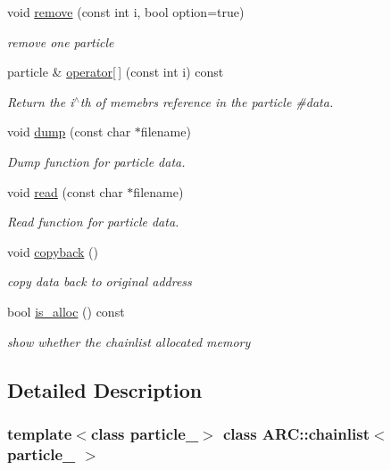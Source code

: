 \begin{DoxyCompactItemize}
void \hyperlink{classARC_1_1chainlist_ac11bd643c5ae8e8ec42623041a1ef34c}{remove} (const int i, bool option=true)
\begin{DoxyCompactList}\small\item\em remove one particle \end{DoxyCompactList}\item 
particle \& \hyperlink{classARC_1_1chainlist_aec9297c53f0f392257aed1c76c537884}{operator\mbox{[}$\,$\mbox{]}} (const int i) const
\begin{DoxyCompactList}\small\item\em Return the i$^\wedge$th of memebr\textquotesingle{}s reference in the particle \#data. \end{DoxyCompactList}\item 
void \hyperlink{classARC_1_1chainlist_a4b42fabdc7ff6edca56ce65b316f581f}{dump} (const char $\ast$filename)
\begin{DoxyCompactList}\small\item\em Dump function for particle data. \end{DoxyCompactList}\item 
void \hyperlink{classARC_1_1chainlist_adfa67e2ccdbdfd7ed945fa7617f90ecc}{read} (const char $\ast$filename)
\begin{DoxyCompactList}\small\item\em Read function for particle data. \end{DoxyCompactList}\item 
void \hyperlink{classARC_1_1chainlist_aba70559e1b70882256a7805744e22b25}{copyback} ()
\begin{DoxyCompactList}\small\item\em copy data back to original address \end{DoxyCompactList}\item 
bool \hyperlink{classARC_1_1chainlist_a0e2f35b8eabe9d9ecd77ed9f24e083de}{is\+\_\+alloc} () const
\begin{DoxyCompactList}\small\item\em show whether the chainlist allocated memory \end{DoxyCompactList}\end{DoxyCompactItemize}


\subsection{Detailed Description}
\subsubsection*{template$<$class particle\+\_\+$>$\newline
class A\+R\+C\+::chainlist$<$ particle\+\_\+ $>$}

